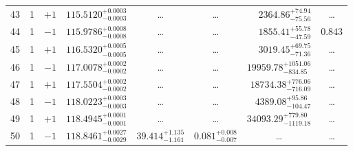 \begin{table*}[!]
\begin{tabular}{llcrrlrc}
43 & 1 & $+1$ & $    115.5120_{-      0.0003}^{+      0.0003}$ & \multicolumn{1}{c}{\dots} & \multicolumn{1}{c}{\dots} & $     2364.86_{-       75.56}^{+       74.94}$ & \dots \\[1pt]
44 & 1 & $-1$ & $    115.9786_{-      0.0008}^{+      0.0008}$ & \multicolumn{1}{c}{\dots} & \multicolumn{1}{c}{\dots} & $     1855.41_{-       47.59}^{+       55.78}$ & 0.843 \\[1pt]
45 & 1 & $+1$ & $    116.5320_{-      0.0005}^{+      0.0005}$ & \multicolumn{1}{c}{\dots} & \multicolumn{1}{c}{\dots} & $     3019.45_{-       71.36}^{+       69.75}$ & \dots \\[1pt]
46 & 1 & $-1$ & $    117.0078_{-      0.0002}^{+      0.0002}$ & \multicolumn{1}{c}{\dots} & \multicolumn{1}{c}{\dots} & $    19959.78_{-      834.85}^{+     1051.06}$ & \dots \\[1pt]
47 & 1 & $+1$ & $    117.5504_{-      0.0002}^{+      0.0002}$ & \multicolumn{1}{c}{\dots} & \multicolumn{1}{c}{\dots} & $    18734.38_{-      716.09}^{+      776.06}$ & \dots \\[1pt]
48 & 1 & $-1$ & $    118.0223_{-      0.0003}^{+      0.0003}$ & \multicolumn{1}{c}{\dots} & \multicolumn{1}{c}{\dots} & $     4389.08_{-      104.47}^{+       95.86}$ & \dots \\[1pt]
49 & 1 & $+1$ & $    118.4945_{-      0.0001}^{+      0.0001}$ & \multicolumn{1}{c}{\dots} & \multicolumn{1}{c}{\dots} & $    34093.29_{-     1119.18}^{+      779.80}$ & \dots \\[1pt]
50 & 1 & $-1$ & $    118.8461_{-      0.0029}^{+      0.0027}$ & $      39.414_{-       1.161}^{+       1.135}$ & $       0.081_{-       0.007}^{+       0.008}$ & \multicolumn{1}{c}{\dots} & \dots \\[1pt]
\hline
\end{tabular}
\end{table*}

